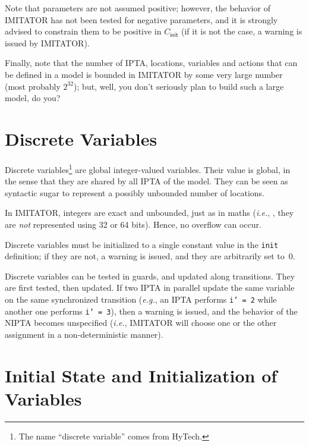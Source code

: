 \documentclass[a4paper,11pt]{report}
\def\init{\ensuremath{\textsf{init}}} %
\newcommand{\C}{C}
\newcommand{\Cinit}{\C_\init} %
\newcommand{\hytech}{{\sc HyTech}}
\newcommand{\imitator}{\textsf{IMITATOR}}
\newcommand{\IPTA}{IPTA}
\newcommand{\NIPTA}{NIPTA}
\newcommand{\styleIMI}[1]{\textcolor{imicolor}{\texttt{#1}}}
\newcommand{\eg}{\textcolor{colorok}{\textit{e.g.}, }}
\newcommand{\ie}{\textcolor{colorok}{\textit{i.e.}, }}
\begin{document}
Note that parameters are not assumed positive; however, the behavior of \imitator{} has not been tested for negative parameters, and it is strongly advised to constrain them to be positive in $\Cinit$ (if it is not the case, a warning is issued by \imitator{}).


Finally, note that the number of \IPTA{}, locations, variables and actions that can be defined in a model is bounded in \imitator{} by some very large number (most probably $2^{32}$); but, well, you don't seriously plan to build such a large model, do you?



\section{Discrete Variables}

Discrete variables\footnote{%
	The name ``discrete variable'' comes from \hytech{}.
}
are global integer-valued variables.
Their value is global, in the sense that they are shared by all \IPTA{} of the model.
They can be seen as syntactic sugar to represent a possibly unbounded number of locations.

In \imitator{}, integers are exact and unbounded, just as in maths (\ie{}, they are \emph{not} represented using 32 or 64 bits).
Hence, no overflow can occur.

Discrete variables must be initialized to a single constant value in the \styleIMI{init} definition;
if they are not, a warning is issued, and they are arbitrarily set to~0.

Discrete variables can be tested in guards, and updated along transitions.
They are first tested, then updated.
If two \IPTA{} in parallel update the same variable on the same synchronized transition (\eg{} an \IPTA{} performs \styleIMI{i' = 2} while another one performs \styleIMI{i' = 3}), then a warning is issued, and the behavior of the \NIPTA{} becomes unspecified (\ie{} \imitator{} will choose one or the other assignment in a non-deterministic manner).



\section{Initial State and Initialization of Variables}\label{ss:init}
\end{document}
